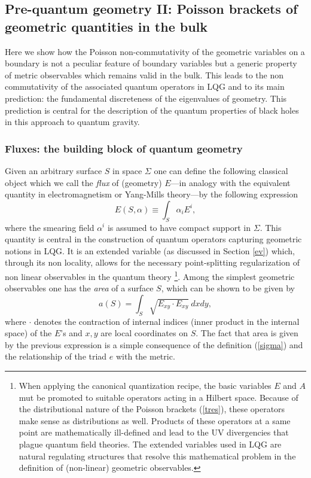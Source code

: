 \documentclass[aps, nofootinbib,superscriptaddress,12pt]{revtex4-2}
\def\be{\begin{equation}}
\def\ee{\end{equation}}
\begin{document}
\subsection{Pre-quantum geometry II: Poisson brackets of geometric quantities in the bulk} 

Here we show how the Poisson non-commutativity of the geometric variables on a boundary is not a peculiar feature of boundary variables but a generic property of metric observables which remains valid in the bulk. This leads to the non commutativity of the associated quantum operators in LQG and to its main prediction: the fundamental discreteness of the eigenvalues of geometry. This prediction is central for the description of the quantum properties of black holes in this approach to quantum gravity. 

\subsubsection{Fluxes: the building block of quantum geometry}
Given an arbitrary surface $S$ in space $\Sigma$  one can define the following classical object which we call the {\em flux} of (geometry) $E$---in analogy with the equivalent quantity in electromagnetism or Yang-Mills theory---by the following expression
\be\label{ffflux}
E(S,\alpha)\equiv \int_S \alpha_iE^i,
\ee
where the smearing field $\alpha^i$ is assumed to have compact support in $\Sigma$. This quantity is central in the construction
of quantum operators capturing geometric notions in LQG. It is an extended variable (as discussed in Section \ref{ev}) which, through its non locality, allows for the necessary point-splitting regularization of non linear observables in the quantum theory \footnote{When applying the canonical quantization recipe, the basic variables $E$ and $A$ mut be promoted to suitable operators acting in a Hilbert space. Because of the distributional nature of the Poisson brackets (\ref{tres}), these operators make sense as distributions as well. Products of these operators at a same point are mathematically ill-defined and lead to the UV divergencies that plague quantum field theories. The extended variables used in LQG are natural regulating structures that resolve this mathematical problem in the definition of (non-linear) geometric observables.}.  Among the simplest geometric observables one has the {\em area} of a surface $S$, which can be shown to be given by 
\be\label{area}
a(S)=\int_S \sqrt{E_{xy}\cdot E_{xy}} \ dx dy, 
\ee
where $\cdot$ denotes the contraction of internal indices (inner product in the internal space) of the $E$'s and $x,y$ are local coordinates on $S$. The fact that area is given by the previous expression is a simple consequence of the definition (\ref{sigma}) and the relationship of the triad $e$ with the metric. 
\end{document}
